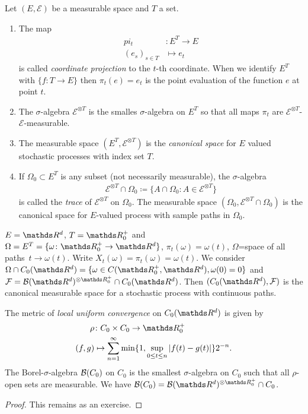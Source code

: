 \begin{defi}
Let $(E,\mathcal{E})$ be a measurable space and $T$ a set.
\begin{enumerate}[label=\roman*)]
\item The map 
\begin{align*}
pi_t&\colon E^T\to E\\
(e_s)_{s\in T} &\mapsto e_t
\end{align*}
is called \emph{coordinate projection} to the $t$-th coordinate.
When we identify $E^T$ with $\{f \colon T \to E\}$ then $\pi_t(e)=e_t$ is the point evaluation of the function $e$ at point $t$.
\item The $\sigma$-algebra $\mathcal{E}^{\otimes T}$ is the smalles $\sigma$-algebra on $E^T$ so that all maps $\pi_t$ are $\mathcal{E}^{\otimes T}$-$\mathcal{E}$-measurable.
\item The measurable space $(E^T,\mathcal{E}^{\otimes T})$ is the \emph{canonical space} for $E$ valued stochastic processes with index set $T$.
\item If $\Omega_0\subset E^T$ is any subset (not necessarily measurable), the $\sigma$-algebra
\begin{align*}
\mathcal{E}^{\otimes T}\cap \Omega_0 \coloneqq \{A \cap \Omega_0 \colon A \in \mathcal{E}^{\otimes T}\}
\end{align*}
is called the \emph{trace} of $\mathcal{E}^{\otimes T}$ on $\Omega_0$.
The measurable space $(\Omega_0,\mathcal{E}^{\otimes T}\cap \Omega_0)$
is the canonical space for $E$-valued process with sample paths in $\Omega_0$.
\end{enumerate}
\end{defi}

\begin{bsp}
$E=\Rd$, $T=\R_0^+$ and $\Omega=E^T=\{\omega \colon \R_0^+ \to \Rd\}$,
$\pi_t(\omega)=\omega(t)$, $\Omega$=space of all \glqq paths\grqq\, $t \to \omega(t)$.
Write $X_t(\omega)=\pi_t(\omega)=\omega(t)$.
We consider $\Omega \cap C_0(\Rd)=\{\omega \in C(\R_0^+,\Rd), \omega(0)=0\}$ and $\mathcal{F}=\Borel(\Rd)^{\otimes \R_0^+} \cap C_0(\Rd)$.
Then $(C_0(\Rd),\mathcal{F})$ is the canonical measurable space for a stochastic process with continuous paths.
\end{bsp}

\begin{bem}
The metric of \emph{local uniform convergence} on $C_0(\Rd)$ is given by 
\begin{align*}
\rho &\colon C_0\times C_0 \to \R_0^+\\
(f,g) &\mapsto \sum_{n=1}^\infty \min\{1,\sup_{0\leq t \leq n}\abs{f(t)-g(t)}\} 2^{-n}. 
\end{align*}
The Borel-$\sigma$-algebra $\mathcal{B}(C_0)$ on $C_0$ is the smallest $\sigma$-algebra on $C_0$ such that all $\rho$-open sets are measurable.
We have $\Borel(C_0)=\Borel(\Rd)^{\otimes \R_0^+}\cap C_0$.
\end{bem}
\begin{proof}
This remains as an exercise.
\end{proof}

